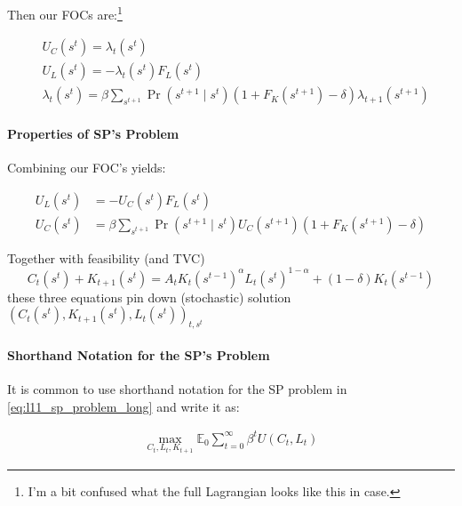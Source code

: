 \documentclass[10pt]{article}
\begin{document}
Then our FOCs are:\footnote{
    \color{red}
    I'm a bit confused what the full Lagrangian looks like this in case.
    \color{black}
}

\begin{align} 
    & U_C\left(s^t\right)=\lambda_t\left(s^t\right) \\ 
    & U_L\left(s^t\right)=-\lambda_t\left(s^t\right) F_L\left(s^t\right) \\ 
    & \lambda_t\left(s^t\right)=\beta \sum_{s^{t+1}} \operatorname{Pr}\left(s^{t+1} \mid s^t\right)\left(1+F_K\left(s^{t+1}\right)-\delta\right) \lambda_{t+1}\left(s^{t+1}\right)
\end{align}



\paragraph{Properties of SP's Problem}

Combining our FOC's yields:

\begin{align}
    U_L\left(s^t\right) & =-U_C\left(s^t\right) F_L\left(s^t\right) \\
    U_C\left(s^t\right) & =\beta \sum_{s^{t+1}} \operatorname{Pr}\left(s^{t+1} \mid s^t\right) U_C\left(s^{t+1}\right)\left(1+F_K\left(s^{t+1}\right)-\delta\right)
\end{align}

Together with feasibility (and TVC)
$$
C_t\left(s^t\right)+K_{t+1}\left(s^t\right)=A_t K_t\left(s^{t-1}\right)^\alpha L_t\left(s^t\right)^{1-\alpha}+(1-\delta) K_t\left(s^{t-1}\right)
$$
these three equations pin down (stochastic) solution $\left(C_t\left(s^t\right), K_{t+1}\left(s^t\right), L_t\left(s^t\right)\right)_{t, s^t}$



\paragraph{Shorthand Notation for the SP's Problem}

It is common to use shorthand notation for the SP problem in \eqref{eq:l11_sp_problem_long} and write it as:

\begin{align}
    \max _{C_t, L_t, K_{t+1}} \mathbb{E}_0 \sum_{t=0}^{\infty} \beta^t U\left(C_t, L_t\right)
\end{align}
\end{document}
